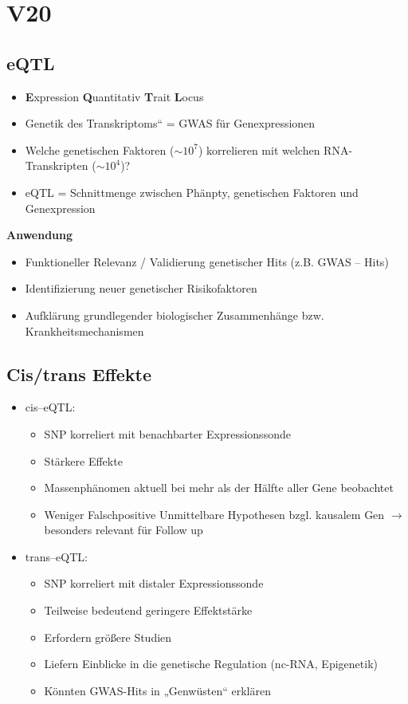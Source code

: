 \section{V20}
\subsection{eQTL}
\begin{itemize}
	\item \textbf{E}xpression \textbf{Q}uantitativ \textbf{T}rait \textbf{L}ocus
	\item Genetik des Transkriptoms“ = GWAS für Genexpressionen
	\item Welche genetischen Faktoren ($\sim 10^7$) korrelieren mit welchen RNA-Transkripten ($\sim 10^4$)?
	\item eQTL = Schnittmenge zwischen Phänpty, genetischen Faktoren und Genexpression
\end{itemize}

\textbf{Anwendung}
\begin{itemize}
	\item Funktioneller Relevanz / Validierung genetischer Hits (z.B. GWAS – Hits)
	\item Identifizierung neuer genetischer Risikofaktoren
	\item Aufklärung grundlegender biologischer Zusammenhänge bzw. Krankheitsmechanismen
\end{itemize}

\subsection{Cis/trans Effekte}
\begin{itemize}
	\item cis–eQTL:
	\begin{itemize}
		\item SNP korreliert mit benachbarter Expressionssonde
		\item Stärkere Effekte
		\item Massenphänomen aktuell bei mehr als der Hälfte aller Gene beobachtet
		\item Weniger Falschpositive Unmittelbare Hypothesen bzgl. kausalem Gen $\rightarrow$ besonders relevant für Follow up
	\end{itemize}
	\item trans–eQTL:
	\begin{itemize}
		\item SNP korreliert mit distaler Expressionssonde
		\item Teilweise bedeutend geringere Effektstärke
		\item Erfordern größere Studien
		\item Liefern Einblicke in die genetische Regulation (nc-RNA, Epigenetik)
		\item Könnten GWAS-Hits in „Genwüsten“ erklären
	\end{itemize}
\end{itemize}

